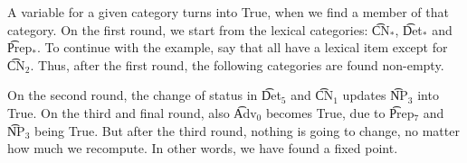 \begin{EmptyItem}
\begin{HighlightingFancy}[]
\OtherTok{::=} \FunctionTok{&&} \FunctionTok{||} \FunctionTok{&&}  \NormalTok{;}
\OtherTok{::=} \FunctionTok{&&} \FunctionTok{||}  \NormalTok{;}
\OtherTok{::=} \FunctionTok{&&}  \NormalTok{;}
\OtherTok{::=} \FunctionTok{&&}  \NormalTok{;}
\OtherTok{::=} \FunctionTok{&&}  \NormalTok{;}
\OtherTok{::=}  \NormalTok{;}
\OtherTok{::=}  \NormalTok{;}
\OtherTok{::=}  \NormalTok{;}
\end{HighlightingFancy}
\end{EmptyItem}

A variable for a given category turns into True, when we find a member
of that category. On the first round, we start from the lexical
categories: \t{CN$_*$}, \t{Det$_*$} and \t{Prep$_*$}. To
continue with the example, say that all have a lexical item except for
\t{CN$_\text{2}$}. Thus, after the first round, the following
categories are found non-empty.

\begin{EmptyItem}
\begin{HighlightingFancy}[]
\OtherTok{::=} \FunctionTok{&&} \FunctionTok{||} \FunctionTok{&&}  \NormalTok{;}
\OtherTok{::=} \FunctionTok{&&} \FunctionTok{||}  \NormalTok{;}
\OtherTok{::=} \FunctionTok{&&}  \NormalTok{;}
\OtherTok{::=} \FunctionTok{&&}  \NormalTok{;}
\OtherTok{::=} \FunctionTok{&&}  \NormalTok{;}
\OtherTok{::=}  \NormalTok{;}
\OtherTok{::=}  \NormalTok{;}
\OtherTok{::=}  \NormalTok{;}
\end{HighlightingFancy}
\end{EmptyItem}


On the second round, the change of status in \t{Det$_\text{5}$} and
\t{CN$_\text{1}$} updates \t{NP$_\text{3}$} into True. On the third
and final round, also \t{Adv$_\text{0}$} becomes True, due to
\t{Prep$_\text{7}$} and \t{NP$_\text{3}$} being True. But after the
third round, nothing is going to change, no matter how much we
recompute. In other words, we have found a fixed point.

